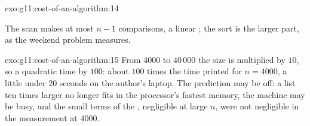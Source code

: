 \begin{solution}{exo:g11:cost-of-an-algorithm:14}
\smallskip\noindent\hspace*{2em}

\noindent\hspace*{4em}

\noindent\hspace*{4em}

\smallskip\noindent The scan makes at most $n - 1$ comparisons, a linear ; the sort is the larger part, as the
weekend problem measures.
\end{solution}

\begin{solution}{exo:g11:cost-of-an-algorithm:15}
From $4000$ to $40\,000$ the size is multiplied by $10$, so a quadratic time by $100$: about $100$ times the time printed
for $n = 4000$, a little under $20$ seconds on the author's laptop. The prediction may be off: a list ten times larger
no longer fits in the processor's fastest memory, the machine may be busy, and the small terms of the , negligible
at large $n$, were not negligible in the measurement at $4000$.
\end{solution}

